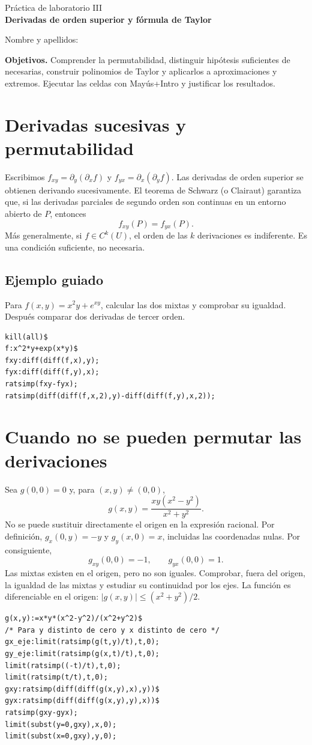\documentclass[12pt,a4paper]{article}
\begin{document}
\begin{center}{\large Práctica de laboratorio III}\\[5pt]{\LARGE\bfseries\color{azul} Derivadas de orden superior y fórmula de Taylor}\end{center}
\noindent Nombre y apellidos: \hrulefill\par\medskip
\noindent\textbf{Objetivos.} Comprender la permutabilidad, distinguir hipótesis suficientes de necesarias, construir polinomios de Taylor y aplicarlos a aproximaciones y extremos. Ejecutar las celdas con Mayús+Intro y justificar los resultados.
\section{Derivadas sucesivas y permutabilidad}
Escribimos $f_{xy}=\partial_y(\partial_x f)$ y $f_{yx}=\partial_x(\partial_y f)$. Las derivadas de orden superior se obtienen derivando sucesivamente. El teorema de Schwarz (o Clairaut) garantiza que, si las derivadas parciales de segundo orden son continuas en un entorno abierto de $P$, entonces
\[\boxed{f_{xy}(P)=f_{yx}(P).}\]
Más generalmente, si $f\in C^k(U)$, el orden de las $k$ derivaciones es indiferente. Es una condición suficiente, no necesaria.
\subsection*{Ejemplo guiado} Para $f(x,y)=x^2y+e^{xy}$, calcular las dos mixtas y comprobar su igualdad. Después comparar dos derivadas de tercer orden.
\begin{lstlisting}
kill(all)$
f:x^2*y+exp(x*y)$
fxy:diff(diff(f,x),y);
fyx:diff(diff(f,y),x);
ratsimp(fxy-fyx);
ratsimp(diff(diff(f,x,2),y)-diff(diff(f,y),x,2));
\end{lstlisting}
\section{Cuando no se pueden permutar las derivaciones}
Sea $g(0,0)=0$ y, para $(x,y)\ne(0,0)$,
\[g(x,y)=\frac{xy(x^2-y^2)}{x^2+y^2}.\]
No se puede sustituir directamente el origen en la expresión racional. Por definición, $g_x(0,y)=-y$ y $g_y(x,0)=x$, incluidas las coordenadas nulas. Por consiguiente,
\[\boxed{g_{xy}(0,0)=-1,\qquad g_{yx}(0,0)=1.}\]
Las mixtas existen en el origen, pero no son iguales. Comprobar, fuera del origen, la igualdad de las mixtas y estudiar su continuidad por los ejes. La función es diferenciable en el origen: $|g(x,y)|\le (x^2+y^2)/2$.
\begin{lstlisting}
g(x,y):=x*y*(x^2-y^2)/(x^2+y^2)$
/* Para y distinto de cero y x distinto de cero */
gx_eje:limit(ratsimp(g(t,y)/t),t,0);
gy_eje:limit(ratsimp(g(x,t)/t),t,0);
limit(ratsimp((-t)/t),t,0);
limit(ratsimp(t/t),t,0);
gxy:ratsimp(diff(diff(g(x,y),x),y))$
gyx:ratsimp(diff(diff(g(x,y),y),x))$
ratsimp(gxy-gyx);
limit(subst(y=0,gxy),x,0);
limit(subst(x=0,gxy),y,0);
\end{lstlisting}
\end{document}
